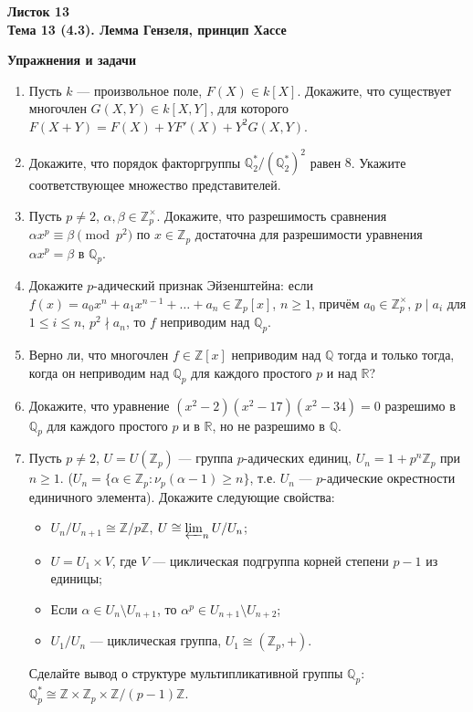 \documentclass[a4paper, 11pt]{article}
\begin{document}
\begin{center} \Large \bf Листок 13\\ Тема 13 (4.3). Лемма Гензеля, принцип Хассе \end{center}

\noindent\textbf{Упражнения и задачи}
\begin{enumerate}[topsep=0pt]

    \item Пусть $k$ --- произвольное поле, $F(X) \in k[X]$. Докажите, что существует многочлен $G(X,Y)\in k[X,Y]$, для которого $F(X+Y)=F(X)+YF'(X)+Y^2G(X,Y)$.

    \item Докажите, что порядок факторгруппы $\mathbb{Q}_2^*/(\mathbb{Q}_2^*)^2$ равен $8$. Укажите соответствующее множество представителей.

    \item Пусть $p \neq 2$, $\alpha, \beta \in \mathbb{Z}_p^\times$. Докажите, что разрешимость сравнения $\alpha x^p \equiv \beta \pmod{p^2}$ по $x\in\mathbb{Z}_p$ достаточна для разрешимости уравнения $\alpha x^p = \beta$ в $\mathbb{Q}_p$. %

    \item Докажите $p$-адический признак Эйзенштейна: если $f(x)=a_0x^n+a_1x^{n-1}+\dots+a_n\in\mathbb{Z}_p[x]$, $n\ge1$, причём $a_0\in\mathbb{Z}_p^\times$, $p\mid a_i$ для $1\le i\le n$, $p^2\nmid a_n$, то $f$ неприводим над $\mathbb{Q}_p$.

    \item Верно ли, что многочлен $f\in\mathbb{Z}[x]$ неприводим над $\mathbb{Q}$ тогда и только тогда, когда он неприводим над $\mathbb{Q}_p$ для каждого простого $p$ и над $\mathbb{R}$? %

    \item Докажите, что уравнение $(x^2-2)(x^2-17)(x^2-34)=0$ разрешимо в $\mathbb{Q}_p$ для каждого простого $p$ и в $\mathbb{R}$, но не разрешимо в $\mathbb{Q}$.
    
    \item Пусть $p \neq 2$, $U=U(\mathbb{Z}_p)$ --- группа $p$-адических единиц, $U_n = 1+p^n \mathbb{Z}_p$ при $n\ge1$. ($U_n = \{\alpha \in \mathbb{Z}_p: \nu_p(\alpha - 1) \geqslant n \}$, т.е. $U_n$ --- $p$-адические окрестности единичного элемента). Докажите следующие свойства:
    \begin{itemize}[topsep=0pt]
        \item $U_n/U_{n+1} \cong \mathbb{Z}/p\mathbb{Z}$, $U\cong\varprojlim_{n} U/U_n$;
        \item $U=U_1\times V$, где $V$ --- циклическая подгруппа корней степени $p-1$ из единицы;
        \item Если $\alpha \in U_n \setminus U_{n+1}$, то $\alpha^p \in U_{n+1} \setminus U_{n+2}$;
        \item $U_1/U_n$ --- циклическая группа, $U_1 \cong (\mathbb{Z}_p,+)$.
    \end{itemize}
    Сделайте вывод о структуре мультипликативной группы $\mathbb{Q}_p$: $\mathbb{Q}_p^* \cong \mathbb{Z} \times \mathbb{Z}_p \times \mathbb{Z}/(p-1)\mathbb{Z}$.


\end{enumerate}
\end{document}
